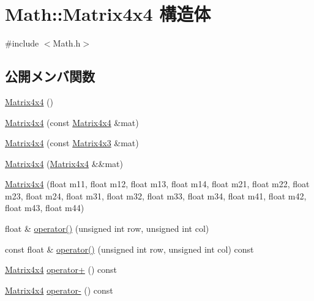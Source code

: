 \hypertarget{struct_math_1_1_matrix4x4}{}\section{Math\+:\+:Matrix4x4 構造体}
\label{struct_math_1_1_matrix4x4}


{\ttfamily \#include $<$Math.\+h$>$}

\subsection*{公開メンバ関数}
\begin{DoxyCompactItemize}
\item 
\mbox{\hyperlink{struct_math_1_1_matrix4x4_a714a467ba7f85f88ebe3897b5e3580be}{Matrix4x4}} ()
\item 
\mbox{\hyperlink{struct_math_1_1_matrix4x4_affb9606dbdc0c8995cbe544f474e64a4}{Matrix4x4}} (const \mbox{\hyperlink{struct_math_1_1_matrix4x4}{Matrix4x4}} \&mat)
\item 
\mbox{\hyperlink{struct_math_1_1_matrix4x4_a5742d2aa46a5555a89718ee256d24687}{Matrix4x4}} (const \mbox{\hyperlink{struct_math_1_1_matrix4x3}{Matrix4x3}} \&mat)
\item 
\mbox{\hyperlink{struct_math_1_1_matrix4x4_adc4b241f8829fb8f3272909cd9d39966}{Matrix4x4}} (\mbox{\hyperlink{struct_math_1_1_matrix4x4}{Matrix4x4}} \&\&mat)
\item 
\mbox{\hyperlink{struct_math_1_1_matrix4x4_a800b92eacd31be52d0ad1c52d74bd16a}{Matrix4x4}} (float m11, float m12, float m13, float m14, float m21, float m22, float m23, float m24, float m31, float m32, float m33, float m34, float m41, float m42, float m43, float m44)
\item 
float \& \mbox{\hyperlink{struct_math_1_1_matrix4x4_a9a2d9a85d02f98341b7406fbdf39d60a}{operator()}} (unsigned int row, unsigned int col)
\item 
const float \& \mbox{\hyperlink{struct_math_1_1_matrix4x4_afdbffc353a52b2aa9b622b47bb13b9c9}{operator()}} (unsigned int row, unsigned int col) const
\item 
\mbox{\hyperlink{struct_math_1_1_matrix4x4}{Matrix4x4}} \mbox{\hyperlink{struct_math_1_1_matrix4x4_a1962a62b402bfb5076a67cc87e5fb4d7}{operator+}} () const
\item 
\mbox{\hyperlink{struct_math_1_1_matrix4x4}{Matrix4x4}} \mbox{\hyperlink{struct_math_1_1_matrix4x4_a6df8840e180ef2dd22d00b63fd94be29}{operator-\/}} () const
\item 

\end{DoxyCompactItemize}
